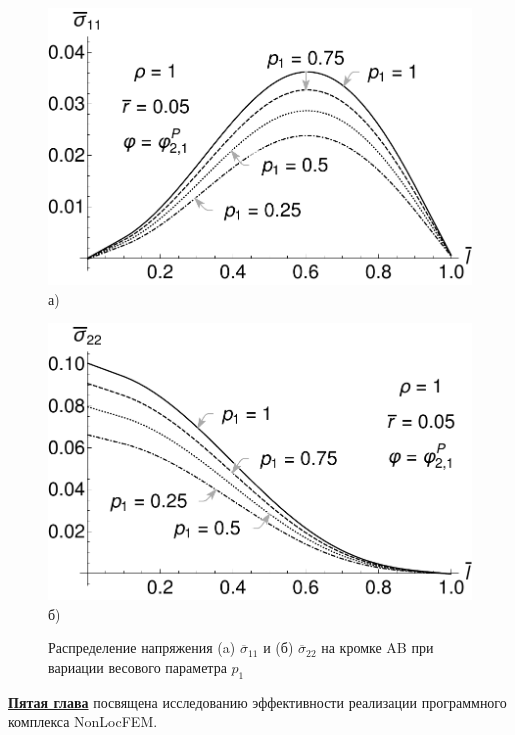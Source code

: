 \begin{figure}[ht]
    \begin{minipage}[b][][b]{0.4\linewidth}\centering
        \includegraphics[width=\linewidth]{pics/ThermalKirshSigma11VariationP1.pdf} \\ а)
    \end{minipage}
    \hfill
    \begin{minipage}[b][][b]{0.4\linewidth}\centering
        \includegraphics[width=\linewidth]{pics/ThermalKirshSigma22VariationP1.pdf} \\ б)
    \end{minipage}
    \caption{Распределение напряжения (a) $\overline{\sigma}_{11}$ и (б) $\overline{\sigma}_{22}$ на кромке AB при вариации весового параметра $p_1$}
    \label{fig:ThermalKirshP1Variation}
\end{figure}

\underline{\textbf{Пятая глава}} посвящена исследованию эффективности реализации программного комплекса NonLocFEM.

